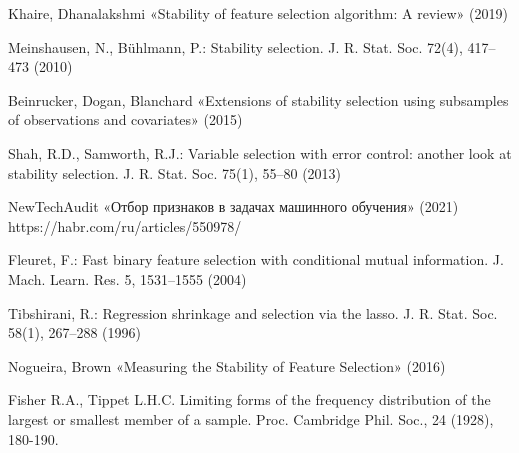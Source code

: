 \documentclass[14pt,a4paper]{extarticle}
\begin{document}
%
\begin{thebibliography}{3}

 Khaire, Dhanalakshmi «Stability of feature selection algorithm: A review» (2019) 

 Meinshausen, N., Bühlmann, P.: Stability selection. J. R. Stat. Soc.
72(4), 417–473 (2010)

 Beinrucker, Dogan, Blanchard  «Extensions of stability selection using subsamples of observations and covariates» (2015)

 Shah, R.D., Samworth, R.J.: Variable selection with error control:
another look at stability selection. J. R. Stat. Soc. 75(1), 55–80
(2013)

 NewTechAudit «Отбор признаков в задачах машинного обучения» (2021) https://habr.com/ru/articles/550978/

 Fleuret, F.: Fast binary feature selection with conditional mutual information. J. Mach. Learn. Res. 5, 1531–1555 (2004)

 Tibshirani, R.: Regression shrinkage and selection via the lasso. J. R. Stat. Soc. 58(1), 267–288 (1996)

 Nogueira, Brown «Measuring the Stability of Feature Selection» (2016)

 Fisher R.A., Tippet L.H.C. Limiting forms of the frequency distribution of the largest or smallest member of a sample. Proc. Cambridge Phil. Soc., 24 (1928), 180-190.


\end{thebibliography}
\end{document}
